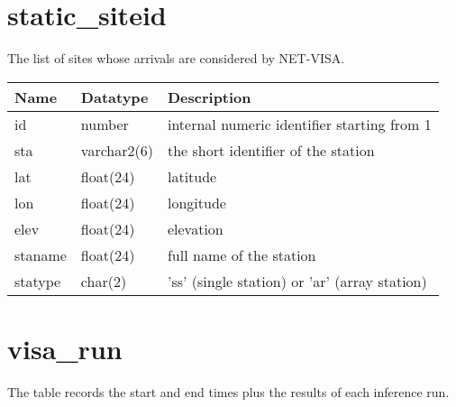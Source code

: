 \section{static\_siteid}\label{tbl-static-siteid}

The list of sites whose arrivals are considered by NET-VISA.

\begin{center}
\begin{tabular}{|l|l|l|}
\hline
\bf{Name} & \bf{Datatype} & \bf{Description} \\
\hline
id & number & internal numeric identifier starting from 1\\
sta & varchar2(6) & the short identifier of the station \\
lat & float(24) & latitude \\
lon & float(24) & longitude \\
elev & float(24) & elevation \\
staname & float(24) & full name of the station \\
statype & char(2) & 'ss' (single station) or 'ar' (array station) \\
\hline
\end{tabular}
\end{center}

\section{visa\_run} \label{tbl-visa-run}

The table records the start and end times plus the results of each
inference run.

